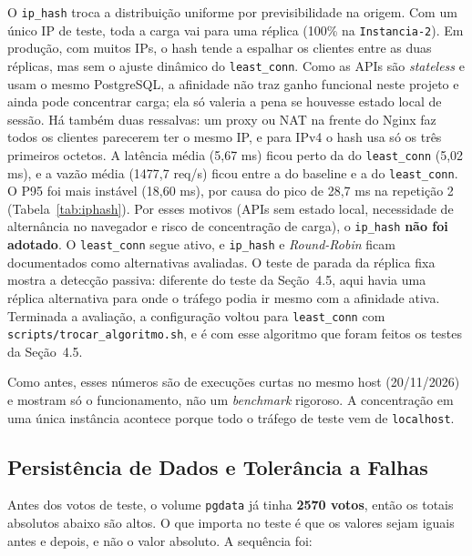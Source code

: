 \documentclass[12pt,a4paper]{article}
\begin{document}
O \texttt{ip\_hash} troca a distribuição uniforme por previsibilidade na origem. Com um único IP de teste, toda a carga vai para uma réplica (100\% na \texttt{Instancia-2}). Em produção, com muitos IPs, o hash tende a espalhar os clientes entre as duas réplicas, mas sem o ajuste dinâmico do \texttt{least\_conn}. Como as APIs são \textit{stateless} e usam o mesmo PostgreSQL, a afinidade não traz ganho funcional neste projeto e ainda pode concentrar carga; ela só valeria a pena se houvesse estado local de sessão. Há também duas ressalvas: um proxy ou NAT na frente do Nginx faz todos os clientes parecerem ter o mesmo IP, e para IPv4 o hash usa só os três primeiros octetos. A latência média (5,67 ms) ficou perto da do \texttt{least\_conn} (5,02 ms), e a vazão média (1477,7 req/s) ficou entre a do baseline e a do \texttt{least\_conn}. O P95 foi mais instável (18,60 ms), por causa do pico de 28,7 ms na repetição 2 (Tabela~\ref{tab:iphash}). Por esses motivos (APIs sem estado local, necessidade de alternância no navegador e risco de concentração de carga), o \texttt{ip\_hash} \textbf{não foi adotado}. O \texttt{least\_conn} segue ativo, e \texttt{ip\_hash} e \textit{Round-Robin} ficam documentados como alternativas avaliadas. O teste de parada da réplica fixa mostra a detecção passiva: diferente do teste da Seção~4.5, aqui havia uma réplica alternativa para onde o tráfego podia ir mesmo com a afinidade ativa. Terminada a avaliação, a configuração voltou para \texttt{least\_conn} com \texttt{scripts/trocar\_algoritmo.sh}, e é com esse algoritmo que foram feitos os testes da Seção~4.5.

Como antes, esses números são de execuções curtas no mesmo host (20/11/2026) e mostram só o funcionamento, não um \textit{benchmark} rigoroso. A concentração em uma única instância acontece porque todo o tráfego de teste vem de \texttt{localhost}.

\subsection{Persistência de Dados e Tolerância a Falhas}
Antes dos votos de teste, o volume \texttt{pgdata} já tinha \textbf{2570 votos}, então os totais absolutos abaixo são altos. O que importa no teste é que os valores sejam iguais antes e depois, e não o valor absoluto. A sequência foi:
\end{document}
